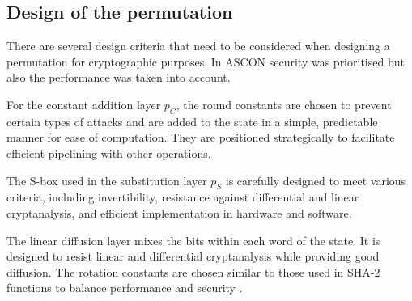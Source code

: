 \subsection{Design of the permutation}

There are several design criteria that need to be considered when designing a permutation for cryptographic purposes. In ASCON security was prioritised but also the performance was taken into account. \par

For the constant addition layer $p_C$, the round constants are chosen to prevent certain types of attacks and are added to the state in a simple, predictable manner for ease of computation. They are positioned strategically to facilitate efficient pipelining with other operations. \par

The S-box used in the substitution layer $p_S$ is carefully designed to meet various criteria, including invertibility, resistance against differential and linear cryptanalysis, and efficient implementation in hardware and software. \par

The linear diffusion layer mixes the bits within each word of the state. It is designed to resist linear and differential cryptanalysis while providing good diffusion. The rotation constants are chosen similar to those used in SHA-2 functions to balance performance and security \cite{DBLP:journals/joc/DobraunigEMS21}. \par




